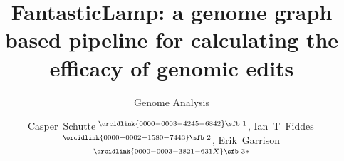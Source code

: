 \documentclass{bioinfo}
\theoremstyle{definition}
\begin{document}

\subtitle{Genome Analysis}

\title[FantasticLamp]{FantasticLamp: a genome graph based pipeline for calculating the efficacy of genomic edits}
\author[Schutte \textit{et~al}.]{

Casper~Schutte\,$^{\orcidlink{0000-0003-4245-6842}\text{\sfb 1}}$,
Ian~T~Fiddes\,$^{\orcidlink{0000-0002-1580-7443}\text{\sfb 2}}$,
Erik~Garrison\,$^{\orcidlink{0000-0003-3821-631X}\text{\sfb 3}*}$
}

\address{
$^{\text{\sf 1}}$Department of Bioinformatics and Computational Biology, University of Stellenbosch, Stellenbosch, 7600, Western Cape, South Africa \\
$^{\text{\sf 2}}$Ian's affiliation goes here \\
$^{\text{\sf 3}}$Department of Genetics, Genomics and Informatics, University of Tennessee Health Science Center, Memphis, 38163, Tennessee, USA \\
}



\end{document}
